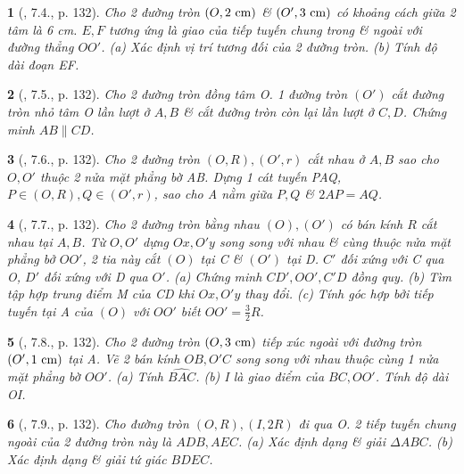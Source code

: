 \documentclass{article}
\newtheorem{baitoan}{}
\begin{document}
\begin{baitoan}[\cite{Binh_boi_duong_Toan_9_tap_1}, 7.4., p. 132]
	Cho 2 đường tròn $(O,2\ {\rm cm})$ \& $(O',3\ {\rm cm})$ có khoảng cách giữa 2 tâm là {\rm6 cm}. $E,F$ tương ứng là giao của tiếp tuyến chung trong \& ngoài với đường thẳng $OO'$. (a) Xác định vị trí tương đối của 2 đường tròn. (b) Tính độ dài đoạn EF.
\end{baitoan}

\begin{baitoan}[\cite{Binh_boi_duong_Toan_9_tap_1}, 7.5., p. 132]
	Cho 2 đường tròn đồng tâm O. 1 đường tròn $(O')$ cắt đường tròn nhỏ tâm O lần lượt ở $A,B$ \& cắt đường tròn còn lại lần lượt ở $C,D$. Chứng minh $AB\parallel CD$.
\end{baitoan}

\begin{baitoan}[\cite{Binh_boi_duong_Toan_9_tap_1}, 7.6., p. 132]
	Cho 2 đường tròn $(O,R),(O',r)$ cắt nhau ở $A,B$ sao cho $O,O'$ thuộc 2 nửa mặt phẳng bờ AB. Dựng 1 cát tuyến PAQ, $P\in(O,R),Q\in(O',r)$, sao cho A nằm giữa $P,Q$ \& $2AP = AQ$.
\end{baitoan}

\begin{baitoan}[\cite{Binh_boi_duong_Toan_9_tap_1}, 7.7., p. 132]
	Cho 2 đường tròn bằng nhau $(O),(O')$ có bán kính $R$ cắt nhau tại $A,B$. Từ $O,O'$ dựng $Ox,O'y$ song song với nhau \& cùng thuộc nửa mặt phẳng bở $OO'$, 2 tia này cắt $(O)$ tại C \& $(O')$ tại D. $C'$ đối xứng với C qua O, $D'$ đối xứng với D qua $O'$. (a) Chứng minh $CD',OO',C'D$ đồng quy. (b) Tìm tập hợp trung điểm M của CD khi $Ox,O'y$ thay đổi. (c) Tính góc hợp bởi tiếp tuyến tại A của $(O)$ với $OO'$ biết $OO' = \frac{3}{2}R$.
\end{baitoan}

\begin{baitoan}[\cite{Binh_boi_duong_Toan_9_tap_1}, 7.8., p. 132]
	Cho 2 đường tròn $(O,3\ {\rm cm})$ tiếp xúc ngoài với đường tròn $(O',1\ {\rm cm})$ tại A. Vẽ 2 bán kính $OB,O'C$ song song với nhau thuộc cùng 1 nửa mặt phẳng bờ $OO'$. (a) Tính $\widehat{BAC}$. (b) I là giao điểm của $BC,OO'$. Tính độ dài OI.
\end{baitoan}

\begin{baitoan}[\cite{Binh_boi_duong_Toan_9_tap_1}, 7.9., p. 132]
	Cho đường tròn $(O,R),(I,2R)$ đi qua O. 2 tiếp tuyến chung ngoài của 2 đường tròn này là $ADB,AEC$. (a) Xác định dạng \& giải $\Delta ABC$. (b) Xác định dạng \& giải tứ giác $BDEC$.
\end{baitoan}
\end{document}
